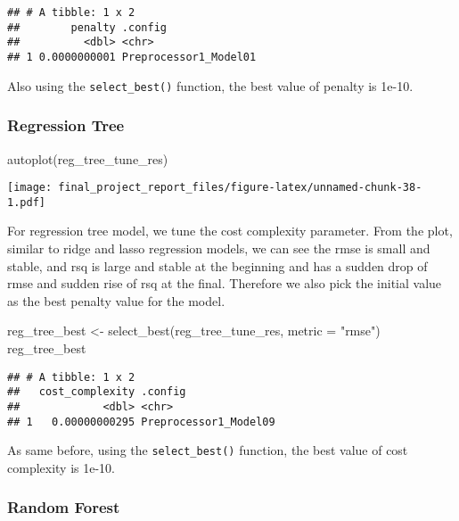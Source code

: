 \documentclass[
]{article}
\newenvironment{Shaded}{\begin{snugshade}}{\end{snugshade}}
\newcommand{\AttributeTok}[1]{\textcolor[rgb]{0.77,0.63,0.00}{#1}}
\newcommand{\FunctionTok}[1]{\textcolor[rgb]{0.00,0.00,0.00}{#1}}
\newcommand{\NormalTok}[1]{#1}
\newcommand{\OtherTok}[1]{\textcolor[rgb]{0.56,0.35,0.01}{#1}}
\newcommand{\StringTok}[1]{\textcolor[rgb]{0.31,0.60,0.02}{#1}}
\begin{document}
\begin{verbatim}
## # A tibble: 1 x 2
##        penalty .config              
##          <dbl> <chr>                
## 1 0.0000000001 Preprocessor1_Model01
\end{verbatim}

Also using the \texttt{select\_best()} function, the best value of
penalty is 1e-10.

\hypertarget{regression-tree-1}{%
\subsubsection{Regression Tree}\label{regression-tree-1}}

\begin{Shaded}
\begin{Highlighting}[]
\FunctionTok{autoplot}\NormalTok{(reg\_tree\_tune\_res)}
\end{Highlighting}
\end{Shaded}

\texttt{[image: final\_project\_report\_files/figure-latex/unnamed-chunk-38-1.pdf]}

For regression tree model, we tune the cost complexity parameter. From
the plot, similar to ridge and lasso regression models, we can see the
rmse is small and stable, and rsq is large and stable at the beginning
and has a sudden drop of rmse and sudden rise of rsq at the final.
Therefore we also pick the initial value as the best penalty value for
the model.

\begin{Shaded}
\begin{Highlighting}[]
\NormalTok{reg\_tree\_best }\OtherTok{\textless{}{-}} \FunctionTok{select\_best}\NormalTok{(reg\_tree\_tune\_res, }\AttributeTok{metric =} \StringTok{"rmse"}\NormalTok{)}
\NormalTok{reg\_tree\_best}
\end{Highlighting}
\end{Shaded}

\begin{verbatim}
## # A tibble: 1 x 2
##   cost_complexity .config              
##             <dbl> <chr>                
## 1   0.00000000295 Preprocessor1_Model09
\end{verbatim}

As same before, using the \texttt{select\_best()} function, the best
value of cost complexity is 1e-10.

\hypertarget{random-forest-1}{%
\subsubsection{Random Forest}\label{random-forest-1}}
\end{document}
